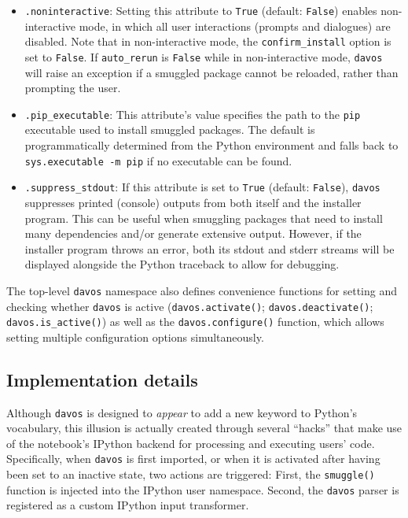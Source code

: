 \documentclass[preprint,12pt,a4paper]{elsarticle}
\begin{document}
\begin{itemize}
\item \texttt{.noninteractive}: Setting this attribute to
  \texttt{True} (default: \texttt{False}) enables non-in\-ter\-act\-ive
  mode, in which all user interactions (prompts and dialogues) are
  disabled. Note that in non-interactive mode, the
  \texttt{confirm\_install} option is set to \texttt{False}.  If
  \texttt{auto\_rerun} is \texttt{False} while in non-interactive
  mode, \texttt{davos} will raise an exception if a smuggled package
  cannot be reloaded, rather than prompting the user.

\item \texttt{.pip\_executable}: This attribute's value specifies the
  path to the \texttt{pip} executable used to install smuggled
  packages. The default is programmatically determined from the Python
  environment and falls back to \texttt{sys.executable -m pip} if no
  executable can be found.

\item \texttt{.suppress\_stdout}: If this attribute is set to
  \texttt{True} (default: \texttt{False}), \texttt{davos} suppresses
  printed (console) outputs from both itself and the installer program.
  This can be useful when smuggling packages that need to install many
  dependencies and/or generate extensive output. However, if the installer
  program throws an error, both its stdout and stderr streams will be
  displayed alongside the Python traceback to allow for debugging.
\end{itemize}

\noindent The top-level \texttt{davos} namespace also defines
convenience functions for setting and checking whether \texttt{davos}
is active (\texttt{davos.activate()}; \texttt{davos.deactivate()};
\texttt{davos.is\_active()}) as well as the \texttt{davos.configure()}
function, which allows setting multiple configuration options
simultaneously.

\subsection{Implementation details}\label{subsec:implementation}

Although \texttt{davos} is designed to \textit{appear} to add a new
keyword to Python's vocabulary, this illusion is actually created through
several ``hacks'' that make use of the notebook's IPython backend
for processing and executing users' code.  Specifically, when
\texttt{davos} is first imported, or when it is activated after having been
set to an inactive state, two actions are triggered:  First, the
\texttt{smuggle()} function is injected into the IPython user
namespace.  Second, the \texttt{davos} parser is registered as a
custom IPython input transformer.
\end{document}
